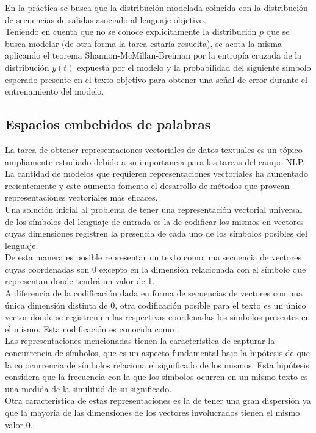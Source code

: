 \documentclass{article}
\begin{document}
	En la práctica se busca que la distribución modelada coincida con la distribución de secuencias de salidas asociado al lenguaje objetivo. \\
	Teniendo en cuenta que no se conoce explícitamente la distribución $p$ que se busca modelar (de otra forma la tarea estaría resuelta), se acota la misma\cite{34JurafskyBook} aplicando el teorema Shannon-McMillan-Breiman por la entropía cruzada de la distribución $y(t)$ expuesta por el modelo y la probabilidad del siguiente símbolo esperado presente en el texto objetivo para obtener una señal de error durante el entrenamiento del modelo.\\
	
	
	\subsection{Espacios embebidos de palabras}
	La tarea de obtener representaciones vectoriales de datos textuales es un tópico ampliamente estudiado\cite{35MikolovRecurrentEmbedings} debido a su importancia para las tareas del campo NLP.\\
	La cantidad de modelos que requieren representaciones vectoriales ha aumentado recientemente y este aumento fomento el desarrollo de métodos que provean representaciones vectoriales más eficaces\cite{36MikolovImprovement}.\\
	
	Una solución inicial al problema de tener una representación vectorial universal de los símbolos del lenguaje de entrada es la de codificar los mismos en vectores cuyas dimensiones registren la presencia de cada uno de los símbolos posibles del lenguaje.\\
	De esta manera es posible representar un texto como una secuencia de vectores cuyas coordenadas son 0 excepto en la dimensión relacionada con el símbolo que representan donde tendrá un valor de 1. \\
	A diferencia de la codificación dada en forma de secuencias de vectores con una única dimensión distinta de 0, otra codificación posible para el texto es un único vector donde se registren en las respectivas coordenadas los símbolos presentes en el mismo. Esta codificación es conocida como .\\
	
	Las representaciones mencionadas tienen la característica de capturar la concurrencia de símbolos, que es un aspecto fundamental bajo la hipótesis de que la co ocurrencia de símbolos relaciona el significado de los mismos. Esta hipótesis considera que la frecuencia con la que los símbolos ocurren en un mismo texto es una medida de la similitud de su significado.\\
	Otra característica de estas representaciones es la de tener una gran dispersión ya que la mayoría de las dimensiones de los vectores involucrados tienen el mismo valor 0.\\
	
\end{document}
